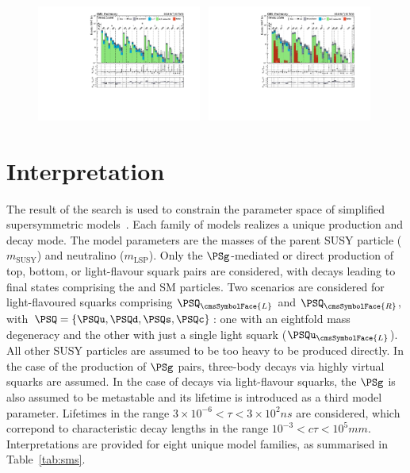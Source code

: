 \begin{figure}[!t]
  \includegraphics[width=0.48\textwidth, trim=10 0 60 10, clip=true]{Figures/5jet_cr-only.pdf}~
  \includegraphics[width=0.48\textwidth, trim=10 0 60 10, clip=true]{Figures/6jet_cr-only.pdf}\\
  \label{fig:result}
\end{figure}


\section{Interpretation}
\label{sec:interpretations}

The result of the search is used to constrain the parameter space of
simplified supersymmetric models~\cite{Alwall:2008ag, Alwall:2008va,
  sms}. Each family of models realizes a unique production and decay
mode. The model parameters are the masses of the parent SUSY particle
($m_\text{SUSY}$) and neutralino ($m_\text{LSP}$). Only the
$\PSg$-mediated or direct production of top, bottom, or light-flavour
squark pairs are considered, with decays leading to final states
comprising the \chiz and SM particles. Two scenarios are considered
for light-flavoured squarks comprising $\PSQ_\cmsSymbolFace{L}$ and
$\PSQ_\cmsSymbolFace{R}$, with $\PSQ = \{\PSQu, \PSQd, \PSQs,
\PSQc\}$: one with an eightfold mass degeneracy and the other with
just a single light squark (\eg $\PSQu_\cmsSymbolFace{L}$). All other
SUSY particles are assumed to be too heavy to be produced directly. In
the case of the production of $\PSg$ pairs, three-body decays via
highly virtual squarks are assumed. In the case of decays via
light-flavour squarks, the $\PSg$ is also assumed to be metastable and
its lifetime is introduced as a third model parameter. Lifetimes in
the range $3{\times}10^{-6} < \tau < 3{\times}10^{2}\unit{ns}$ are
considered, which correpond to characteristic decay lengths in the
range $10^{-3} < c\tau < 10^{5}\unit{mm}$. Interpretations are
provided for eight unique model families, as summarised in
Table~\ref{tab:sms}.

